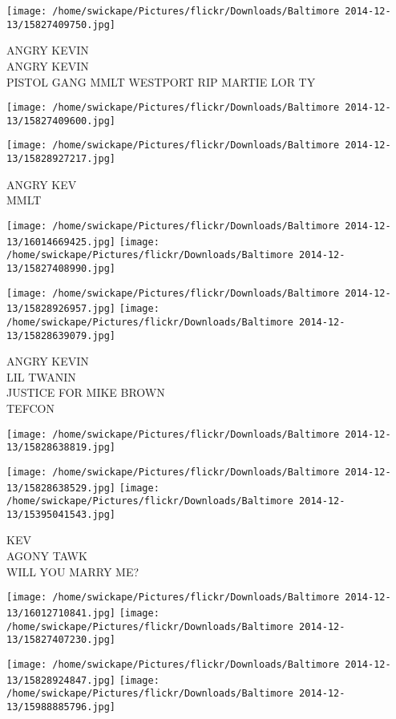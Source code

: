 \documentclass[10pt,letterpaper]{article}
\begin{document}
\vspace{0.25in}
\texttt{[image: /home/swickape/Pictures/flickr/Downloads/Baltimore 2014-12-13/15827409750.jpg]}

ANGRY KEVIN\\
ANGRY KEVIN\\
PISTOL GANG MMLT WESTPORT RIP MARTIE LOR TY
\pagebreak

\texttt{[image: /home/swickape/Pictures/flickr/Downloads/Baltimore 2014-12-13/15827409600.jpg]}

\vspace{0.25in}
\texttt{[image: /home/swickape/Pictures/flickr/Downloads/Baltimore 2014-12-13/15828927217.jpg]}

ANGRY KEV\\
MMLT
\pagebreak

\texttt{[image: /home/swickape/Pictures/flickr/Downloads/Baltimore 2014-12-13/16014669425.jpg]}
\texttt{[image: /home/swickape/Pictures/flickr/Downloads/Baltimore 2014-12-13/15827408990.jpg]}

\texttt{[image: /home/swickape/Pictures/flickr/Downloads/Baltimore 2014-12-13/15828926957.jpg]}
\texttt{[image: /home/swickape/Pictures/flickr/Downloads/Baltimore 2014-12-13/15828639079.jpg]}

ANGRY KEVIN\\
LIL TWANIN\\
JUSTICE FOR MIKE BROWN\\
TEFCON
\pagebreak

\texttt{[image: /home/swickape/Pictures/flickr/Downloads/Baltimore 2014-12-13/15828638819.jpg]}

\vspace{0.25in}
\texttt{[image: /home/swickape/Pictures/flickr/Downloads/Baltimore 2014-12-13/15828638529.jpg]}
\texttt{[image: /home/swickape/Pictures/flickr/Downloads/Baltimore 2014-12-13/15395041543.jpg]}

KEV\\
AGONY TAWK\\
WILL YOU MARRY ME?
\pagebreak

\texttt{[image: /home/swickape/Pictures/flickr/Downloads/Baltimore 2014-12-13/16012710841.jpg]}
\texttt{[image: /home/swickape/Pictures/flickr/Downloads/Baltimore 2014-12-13/15827407230.jpg]}

\texttt{[image: /home/swickape/Pictures/flickr/Downloads/Baltimore 2014-12-13/15828924847.jpg]}
\texttt{[image: /home/swickape/Pictures/flickr/Downloads/Baltimore 2014-12-13/15988885796.jpg]}
\end{document}
